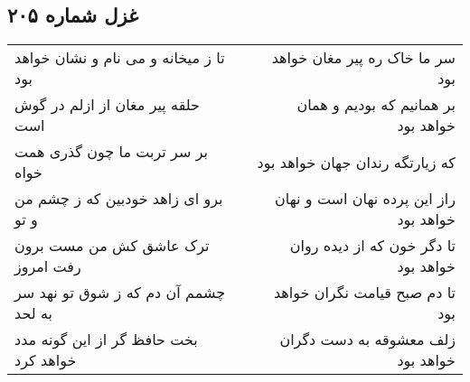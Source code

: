 \begin{center}
\section*{غزل شماره ۲۰۵}
\label{sec:sh205}
\begin{longtable}{l p{0.5cm} r}
تا ز میخانه و می نام و نشان خواهد بود
&&
سر ما خاک ره پیر مغان خواهد بود
\\
حلقه پیر مغان از ازلم در گوش است
&&
بر همانیم که بودیم و همان خواهد بود
\\
بر سر تربت ما چون گذری همت خواه
&&
که زیارتگه رندان جهان خواهد بود
\\
برو ای زاهد خودبین که ز چشم من و تو
&&
راز این پرده نهان است و نهان خواهد بود
\\
ترک عاشق کش من مست برون رفت امروز
&&
تا دگر خون که از دیده روان خواهد بود
\\
چشمم آن دم که ز شوق تو نهد سر به لحد
&&
تا دم صبح قیامت نگران خواهد بود
\\
بخت حافظ گر از این گونه مدد خواهد کرد
&&
زلف معشوقه به دست دگران خواهد بود
\\
\end{longtable}
\end{center}
